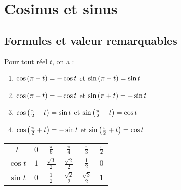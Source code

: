 \section{Cosinus et sinus}
\subsection{Formules et valeur remarquables}

\begin{formu}
	Pour tout réel \(t\), on a :
	\begin{enumerate}
		\item \( \cos\left(\pi - t\right) = -\cos t \) et \( \sin\left(\pi - t\right) = \sin t \) \\
		\item \( \cos\left(\pi + t\right) = -\cos t \) et \( \sin\left(\pi + t\right) = -\sin t \) \\
		\item \( \cos\left(\frac{\pi}{2} - t\right) = \sin t \) et \( \sin\left(\frac{\pi}{2} - t\right) = \cos t \) \\
		\item \( \cos\left(\frac{\pi}{2} + t\right) = -\sin t \) et \( \sin\left(\frac{\pi}{2} + t\right) = \cos t \) \\
	\end{enumerate}
	\begin{tabular}{|c|c|c|c|c|c|}

		\hline
		\(t\)       & \(0\) & \(\frac{\pi}{6}\)      & \(\frac{\pi}{4}\)      & \(\frac{\pi}{3}\)       & \(\frac{\pi}{2}\) \\
		\hline
		\(\cos t \) & \(1\) & \(\frac{\sqrt{3}}{2}\) & \(\frac{\sqrt{2}}{2}\) & \(\frac{1}{2}\)        & \(0\)             \\
		\hline
		\(\sin t \) & \(0\) & \(\frac{1}{2}\)        & \(\frac{\sqrt{2}}{2}\) & \(\frac{\sqrt{3}}{2}\) & \(1\)             \\
		\hline
	\end{tabular}
\end{formu}

